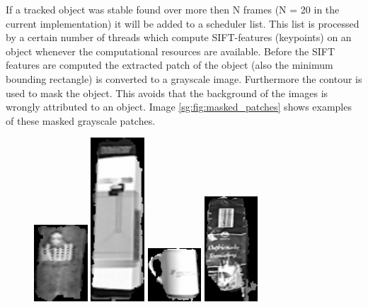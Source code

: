 If a tracked object was stable found over more then N frames (N = 20 in the current implementation) it will be added to a scheduler list. This list is processed by a certain number of threads which compute SIFT-features (keypoints) on an object whenever the computational resources are available. Before the SIFT features are computed the extracted patch of the object (also the minimum bounding rectangle) is converted to a grayscale image. Furthermore the contour is used to mask the object. This avoids that the background of the images is wrongly attributed to an object. Image \ref{sg:fig:masked_patches} shows examples of these masked grayscale patches.
\begin{figure}[ht]
    \centering
        \includegraphics[width=2cm]{images/image_sift_12.jpg}
        \hspace{0.1cm}              
        \includegraphics[width=2cm]{images/image_sift_42.jpg}
        \hspace{0.1cm}              
        \includegraphics[width=2cm]{images/image_sift_69.jpg}
        \hspace{0.1cm}              
        \includegraphics[width=2cm]{images/image_sift_87.jpg}

\end{figure}
